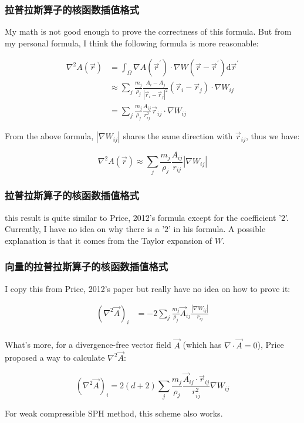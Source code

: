 \begin{frame}
    \frametitle{拉普拉斯算子的核函数插值格式}

    My math is not good enough to prove the correctness of this formula. 
But from my personal formula, I think the following formula is more reasonable:

\begin{equation}
    \begin{aligned}
        \nabla^2 A(\vec{r})&= 
        \int_{\Omega} \nabla A(\vec{r}^\prime) \cdot \nabla W(\vec{r}- \vec{r}^\prime ) \mathrm{d}\vec{r}^\prime\\
        &\approx
        \sum_j \frac{m_j}{\rho_j} \frac{A_i-A_j}{|\vec{r}_i-\vec{r}_j|^2}
        (\vec{r}_i - \vec{r}_j)\cdot \nabla W_{ij}\\
        &=\sum_j \frac{m_j}{\rho_j}\frac{A_{ij}}{r_{ij}^2}\vec{r}_{ij}\cdot \nabla W_{ij}
    \end{aligned}
\end{equation}

From the above formula, $|\nabla W_{ij}|$ shares the same direction with $\vec{r}_{ij}$,
thus we have:

\begin{equation}
    \nabla^2 A(\vec{r})\approx
    \sum_j \frac{m_j}{\rho_j}\frac{A_{ij}}{r_{ij}}|\nabla W_{ij}|
\end{equation}

\end{frame}

\begin{frame}
    \frametitle{拉普拉斯算子的核函数插值格式}

    this result is quite similar to Price, 2012's formula except for the coefficient '$2$'.
Currently, I have no idea on why there is a '$2$' in his formula. 
A possible explanation is that it comes from the Taylor expansion of $W$.

\end{frame}

\begin{frame}
    \frametitle{向量的拉普拉斯算子的核函数插值格式}

    I copy this from Price, 2012's paper but really have no idea on how to prove it:

\begin{equation}
    \begin{aligned}
        (\nabla^2 \vec{A})_i&=-2\sum_j \frac{m_j}{\rho_j}\vec{A}_{ij}\frac{|\nabla W_{ij}|}{r_{ij}}\\
    \end{aligned}
\end{equation}

What's more, for a divergence-free vector field $\vec{A}$ (which has $\nabla\cdot\vec{A}=0$), 
Price proposed a way to calculate $\nabla^2 \vec{A}$:

\begin{equation}
    (\nabla^2 \vec{A})_i=2(d+2)\sum_{j} 
    \frac{m_j}{\rho _j} \frac{\vec{A}_{ij}\cdot \vec{r}_{ij}}{r_{ij}^2}\nabla W_{ij}
\end{equation}

For weak compressible SPH method, this scheme also works.

\end{frame}